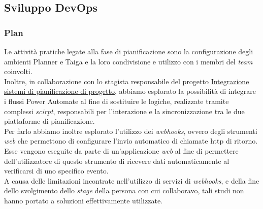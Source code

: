 \subsection{Sviluppo DevOps}
\label{Sviluppo DevOps}
\subsubsection*{Plan} 
Le attività pratiche legate alla fase di pianificazione sono la configurazione degli ambienti Planner e Taiga e la loro condivisione e utilizzo con i membri del \emph{team} coinvolti.\\
Inoltre, in collaborazione con lo stagista responsabile del progetto \hyperref[stageGiacomo]{Integrazione sistemi di pianificazione di progetto}, abbiamo esplorato la possibilità di integrare i flussi Power Automate al fine di sostituire le logiche, realizzate tramite complessi \emph{scirpt}, responsabili per l'interazione e la sincronizzazione tra le due piattaforme di pianificazione.\\
Per farlo abbiamo inoltre esplorato l'utilizzo dei \emph{webhooks}, ovvero degli strumenti \emph{web} che permettono di configurare l'invio automatico di chiamate \gls{http} di ritorno. Esse vengono eseguite da parte di un'applicazione \emph{web} al fine di permettere dell'utilizzatore di questo strumento di ricevere dati automaticamente al verificarsi di uno specifico evento.\\
A causa delle limitazioni incontrate nell'utilizzo di servizi di \emph{webhooks}, e della fine dello svolgimento dello \emph{stage} della persona con cui collaboravo, tali studi non hanno portato a soluzioni effettivamente utilizzate.

